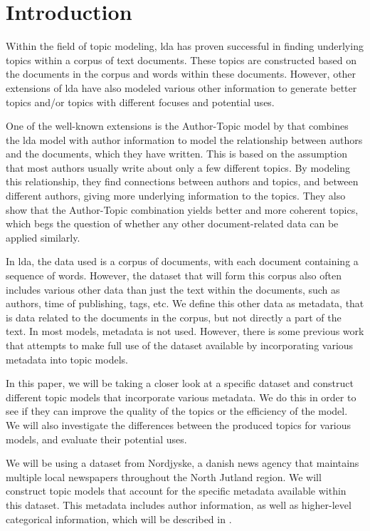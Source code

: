 \section{Introduction}\label{sec:introduction}
Within the field of topic modeling, \gls{lda} has proven successful in finding underlying topics within a corpus of text documents.
These topics are constructed based on the documents in the corpus and words within these documents. 
However, other extensions of \gls{lda} have also modeled various other information to generate better topics and/or topics with different focuses and potential uses.

One of the well-known extensions is the Author-Topic model by \citet{author_topic_2012} that combines the \gls{lda} model with author information to model the relationship between authors and the documents, which they have written.
This is based on the assumption that most authors usually write about only a few different topics.
By modeling this relationship, they find connections between authors and topics, and between different authors, giving more underlying information to the topics.
They also show that the Author-Topic combination yields better and more coherent topics, which begs the question of whether any other document-related data can be applied similarly.

In \gls{lda}, the data used is a corpus of documents, with each document containing a sequence of words.
However, the dataset that will form this corpus also often includes various other data than just the text within the documents, such as authors, time of publishing, tags, etc.
We define this other data as metadata, that is data related to the documents in the corpus, but not directly a part of the text.
In most models, metadata is not used.
However, there is some previous work that attempts to make full use of the dataset available by incorporating various metadata into topic models.

In this paper, we will be taking a closer look at a specific dataset and construct different topic models that incorporate various metadata.
We do this in order to see if they can improve the quality of the topics or the efficiency of the model.
We will also investigate the differences between the produced topics for various models, and evaluate their potential uses.

We will be using a dataset from Nordjyske, a danish news agency that maintains multiple local newspapers throughout the North Jutland region.
We will construct topic models that account for the specific metadata available within this dataset.
This metadata includes author information, as well as higher-level categorical information, which will be described in .

